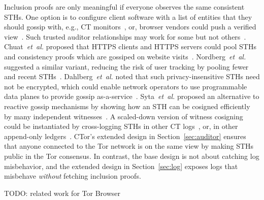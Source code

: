 Inclusion proofs are only meaningful if everyone observes the same consistent
STHs.
One option is to configure client software with a list of entities that they
should gossip with, e.g., CT monitors~\cite{chase}, or,
browser vendors could push a verified view~\cite{sth-push}.
Such trusted auditor relationships may work for some but not
others~\cite{nordberg}.
Chuat~\emph{et~al.} proposed that HTTPS clients and HTTPS servers could pool
STHs and consistency proofs which are gossiped on website visits~\cite{chuat}.
Nordberg~\emph{et~al.} suggested a similar variant, reducing the risk of user
tracking by pooling fewer and recent STHs~\cite{nordberg}.
Dahlberg~\emph{et~al.} noted that such privacy-insensitive STHs need not be
encrypted, which could enable network operators to use programmable data planes
to provide gossip as-a-service~\cite{dahlberg}.
Syta~\emph{et~al.} proposed an alternative to reactive gossip mechanisms by
showing how an STH can be cosigned efficiently by many independent
witnesses~\cite{syta}.
A scaled-down version of witness cosigning could be instantiated by
cross-logging STHs in other CT logs~\cite{minimal-gossip},
or, in other append-only ledgers~\cite{catena}.
CTor's extended design in Section~\ref{sec:auditor} ensures that anyone
connected to the Tor network is on the same view by making STHs public in the
Tor consensus.  In contrast, the base design is not about catching log
misbehavior, and the extended design in Section~\ref{sec:log} exposes logs
that misbehave \emph{without} fetching inclusion proofs.

TODO: related work for Tor Browser
